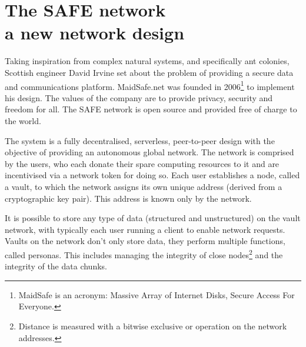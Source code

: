 \documentclass[twocolumn,english]{article}
\begin{document}
\section{The SAFE network \\ a new network design}

Taking inspiration from complex natural systems, and specifically
ant colonies, Scottish engineer David Irvine set about the problem
of providing a secure data and communications platform. MaidSafe.net was founded in 2006\footnote{MaidSafe is an acronym: Massive Array of Internet Disks, Secure Access For Everyone.} to implement his design. The values of the company are to provide privacy, security and freedom for all.  The SAFE network is open source and provided free of charge to the world. %

The system is a fully decentralised, serverless, peer-to-peer design with
the objective of providing an autonomous global network. The network
is comprised by the users, who each donate their spare computing resources
to it and are incentivised via a network token for doing so. Each
user establishes a node, called a vault, to which the network assigns its
own unique address (derived from a cryptographic key pair). This address
is known only by the network.\cite{paulMS}

It is possible to store any type of data (structured and unstructured)
on the vault network, with typically each user running a client to enable
network requests. Vaults on the network don't
only store data, they perform multiple functions, called personas.
This includes managing the integrity of close nodes\footnote{Distance is measured with a bitwise exclusive or operation on the network addresses.} and the integrity of the data chunks.  
\end{document}

